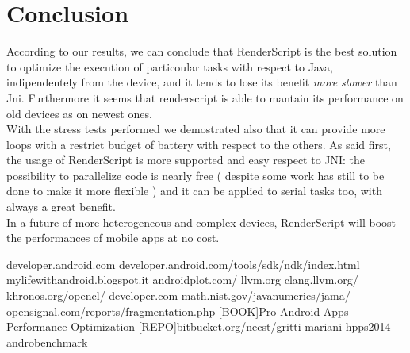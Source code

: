 \documentclass[11pt,english]{article}
\begin{document}
\section{Conclusion}
According to our results, we can conclude that RenderScript is the best solution to optimize the execution of particoular tasks with respect to Java, indipendentely from the device, and it tends to lose its benefit \textit{more slower} than Jni. Furthermore it seems that renderscript is able to mantain its performance on old devices as on newest ones.\\With the stress tests performed we demostrated also that it can provide more loops with a restrict budget of battery with respect to the others. As said first, the usage of RenderScript is more supported and easy respect to JNI: the possibility to parallelize code is nearly free ( despite some work has still to be done to make it more flexible ) and it can be applied to serial tasks too, with always a great benefit.\\In a future of more heterogeneous and complex devices, RenderScript will boost the performances of mobile apps at no cost.
\begin{thebibliography}{10}
 developer.android.com
 developer.android.com/tools/sdk/ndk/index.html
 mylifewithandroid.blogspot.it
 androidplot.com/
 llvm.org
 clang.llvm.org/
 khronos.org/opencl/
 developer.com
 math.nist.gov/javanumerics/jama/
 opensignal.com/reports/fragmentation.php
 [BOOK]Pro Android Apps Performance Optimization
 [REPO]bitbucket.org/necst/gritti-mariani-hpps2014-androbenchmark 

\end{thebibliography}
\end{document}
